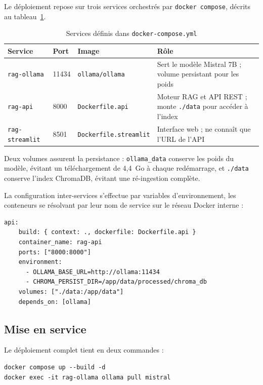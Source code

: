 Le déploiement repose sur trois services orchestrés par \texttt{docker compose},
décrits au tableau~\ref{tab:services}.

\begin{table}[htbp]
\centering
\caption{Services définis dans \texttt{docker-compose.yml}}
\label{tab:services}
\small
\begin{tabularx}{\textwidth}{@{}p{2.7cm}p{1.5cm}p{3.1cm}X@{}}
\toprule
\textbf{Service} & \textbf{Port} & \textbf{Image} & \textbf{Rôle} \\
\midrule
\texttt{rag-ollama} & 11434 & \texttt{ollama/ollama} &
Sert le modèle Mistral 7B ; volume persistant pour les poids \\
\texttt{rag-api} & 8000 & \texttt{Dockerfile.api} &
Moteur RAG et API REST ; monte \texttt{./data} pour accéder à l'index \\
\texttt{rag-streamlit} & 8501 & \texttt{Dockerfile.streamlit} &
Interface web ; ne connaît que l'URL de l'API \\
\bottomrule
\end{tabularx}
\end{table}

Deux volumes assurent la persistance : \texttt{ollama\_data} conserve les poids
du modèle, évitant un téléchargement de 4,4~Go à chaque redémarrage, et
\texttt{./data} conserve l'index ChromaDB, évitant une ré-ingestion complète.

La configuration inter-services s'effectue par variables d'environnement, les
conteneurs se résolvant par leur nom de service sur le réseau Docker interne :

\begin{lstlisting}[style=plain,caption={Extrait de \texttt{docker-compose.yml}}]
  api:
    build: { context: ., dockerfile: Dockerfile.api }
    container_name: rag-api
    ports: ["8000:8000"]
    environment:
      - OLLAMA_BASE_URL=http://ollama:11434
      - CHROMA_PERSIST_DIR=/app/data/processed/chroma_db
    volumes: ["./data:/app/data"]
    depends_on: [ollama]
\end{lstlisting}

\subsection{Mise en service}

Le déploiement complet tient en deux commandes :

\begin{lstlisting}[style=bash,caption={Déploiement conteneurisé}]
docker compose up --build -d
docker exec -it rag-ollama ollama pull mistral
\end{lstlisting}

